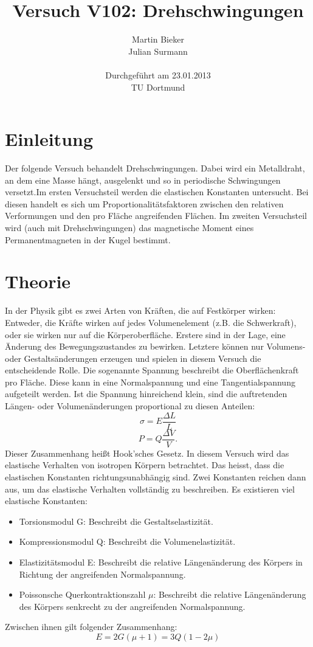 \documentclass[11pt,ngerman,a4paper]{article}
\title{\textbf{Versuch V102: Drehschwingungen}}
\author{Martin Bieker\\
		Julian Surmann\\
		\\
		Durchgef\"{u}hrt am 23.01.2013\\
		TU Dortmund}
\date{}
\begin{document}
\renewcommand\tablename{Tabelle}
\renewcommand\figurename{Abbildung}
\maketitle
\thispagestyle{empty}
\newpage
\clearpage
\setcounter{page}{1}

\section{Einleitung}
Der folgende Versuch behandelt Drehschwingungen. Dabei wird ein Metalldraht, an dem eine Masse hängt, ausgelenkt und so in periodische Schwingungen versetzt.Im ersten Versuchsteil werden die elastischen Konstanten untersucht. Bei diesen handelt es sich um Proportionalitätsfaktoren zwischen den relativen Verformungen und den pro Fläche angreifenden Flächen.
Im zweiten Versuchsteil wird (auch mit Drehschwingungen) das magnetische Moment eines Permanentmagneten in der Kugel bestimmt.
\section{Theorie}
In der Physik gibt es zwei Arten von Kräften, die auf Festkörper wirken: Entweder, die Kräfte wirken auf jedes Volumenelement (z.B. die Schwerkraft), oder sie wirken nur auf die Körperoberfläche. Erstere sind in der Lage, eine Änderung des Bewegungszustandes zu bewirken. Letztere können nur Volumens- oder Gestaltsänderungen erzeugen und spielen in diesem Versuch die entscheidende Rolle. Die sogenannte Spannung beschreibt die Oberflächenkraft pro Fläche. Diese kann in eine Normalspannung und eine Tangentialspannung aufgeteilt werden. Ist die Spannung hinreichend klein, sind die auftretenden Längen- oder Volumenänderungen proportional zu diesen Anteilen:
\begin{equation}
\label{1}
\sigma = E\frac{\Delta L}{L}
\end{equation}
\begin{equation}
\label{2}
P = Q\frac{\Delta V}{V}.
\end{equation}
Dieser Zusammenhang heißt Hook'sches Gesetz.\newline
In diesem Versuch wird das elastische Verhalten von isotropen Körpern betrachtet. Das heisst, dass die elastischen Konstanten richtungsunabhängig sind. Zwei Konstanten reichen dann aus, um das elastische Verhalten vollständig zu beschreiben. Es existieren viel elastische Konstanten:
\begin{itemize}
\item Torsionsmodul G: Beschreibt die Gestaltselastizität.
\item Kompressionsmodul Q: Beschreibt die Volumenelastizität.
\item Elastizitätsmodul E: Beschreibt die relative Längenänderung des Körpers in Richtung der angreifenden Normalspannung.
\item Poissonsche Querkontraktionszahl $\mu$: Beschreibt die relative Längenänderung des Körpers senkrecht zu der angreifenden Normalspannung.
\end{itemize}
Zwischen ihnen gilt folgender Zusammenhang:
\begin{equation}
E = 2G(\mu+1)=3Q(1-2\mu)
\label{3}
\end{equation}
\end{document}

